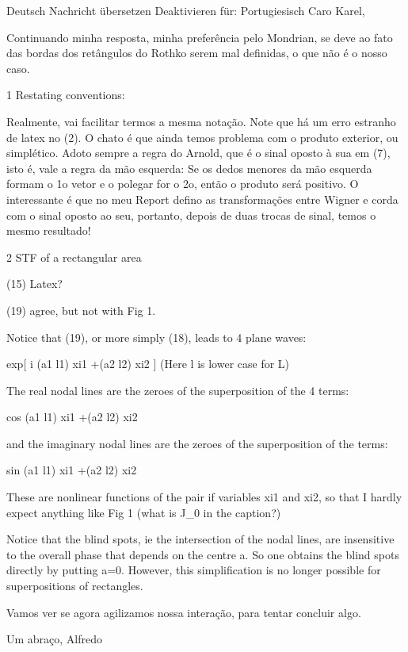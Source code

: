 Deutsch   Nachricht übersetzen
Deaktivieren für: Portugiesisch
Caro Karel,

Continuando minha resposta, minha preferência pelo Mondrian, se deve ao fato
das bordas dos retângulos do Rothko serem mal definidas, o que não é o nosso caso.

1 Restating conventions:

Realmente, vai facilitar termos a mesma notação. Note que há um erro estranho
de latex no (2). O chato é que ainda temos problema com o produto exterior,
ou simplético. Adoto sempre a regra do Arnold, que é o sinal oposto à sua em (7),
isto é, vale a regra da mão esquerda: Se os dedos menores da mão esquerda
formam o 1o vetor e o polegar for o 2o, então o produto será positivo.
O interessante é que no meu Report defino as transformações entre Wigner e corda
com o sinal oposto ao seu, portanto, depois de duas trocas de sinal, temos o mesmo resultado!    

2 STF of a rectangular area

(15) Latex?

(19) agree, but not with Fig 1.

Notice that (19), or more simply (18),  leads to 4 plane waves:

\pm exp[ i {(a1 \pm l1) xi1 +(a2 \pm l2) xi2} ] (Here l is lower case for L)

The real nodal lines are the zeroes of the superposition of the 4 terms:

cos {(a1 \pm l1) xi1 +(a2 \pm l2) xi2} 

and the imaginary nodal lines are the zeroes of the superposition of the terms:

sin {(a1 \pm l1) xi1 +(a2 \pm l2) xi2} 

These are nonlinear functions of the pair if variables xi1 and xi2, so that I hardly
expect anything like Fig 1 (what is J_0 in the caption?)

Notice that the blind spots, ie the intersection of the nodal lines, are insensitive to
the overall phase that depends on the centre a. So one obtains the blind spots directly by putting a=0. However, this simplification is no longer possible for
superpositions of rectangles.

Vamos ver se agora agilizamos nossa interação, para tentar concluir algo.

Um abraço,  Alfredo


